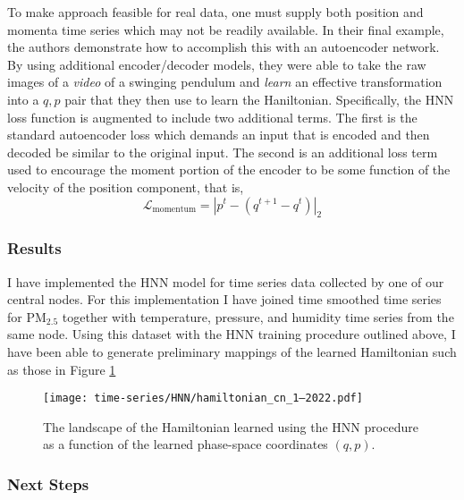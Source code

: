 To make approach feasible for real data, one must supply both position and momenta time series which may not be readily available. In their final example, the authors demonstrate how to accomplish this with an autoencoder network. By using additional encoder/decoder models, they were able to take the raw images of a \textit{video} of a swinging pendulum and \textit{learn} an effective transformation into a $q,p$ pair that they then use to learn the Haniltonian. Specifically, the HNN loss function is augmented to include two additional terms. The first is the standard autoencoder loss which demands an input that is encoded and then decoded be similar to the original input. The second is an additional loss term used to encourage the moment portion of the encoder to be some function of the velocity of the position component, that is,
\begin{equation}
  \mathcal{L}_{\text{momentum}} = \left\lvert p^t - (q^{t+1} - q^{t}) \right\rvert_2
\end{equation}



\subsubsection{Results}

I have implemented the HNN model for time series data collected by one of our central nodes. For this implementation I have joined time smoothed time series for $\text{PM}_{2.5}$ together with temperature, pressure, and humidity time series from the same node. Using this dataset with the HNN training procedure outlined above, I have been able to generate preliminary mappings of the learned Hamiltonian such as those in Figure \ref{fig:learned-hamiltonian}
\begin{figure}[h]
  \centering
  \texttt{[image: time-series/HNN/hamiltonian\_cn\_1--2022.pdf]}
  \caption{The landscape of the Hamiltonian learned using the HNN procedure as a function of the learned phase-space coordinates $(q,p)$.}
  \label{fig:learned-hamiltonian}
\end{figure}

\subsubsection{Next Steps}

